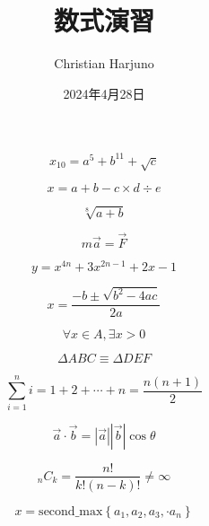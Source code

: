 \documentclass[a4j,twocolumn]{jarticle}
\begin{document}
\title{数式演習}
\author{Christian Harjuno}
\date{2024年4月28日}

\maketitle
\thispagestyle{empty}

\begin{equation}
x_{10}=a^5+b^{11}+\sqrt{c} 
\end{equation}

\begin{equation}
x = a + b - c \times d \div e
\end{equation}

\begin{equation}
\sqrt[8]{a + b}
\end{equation}

\begin{equation}
m\vec{a} = \vec{F}
\end{equation}

\begin{equation}
y = x^{4n} + 3x^{2n-1} + 2x - 1
\end{equation}

\begin{equation}
x = \frac{-b \pm \sqrt{b^2 - 4ac}}{2a}
\end{equation}

\begin{equation}
\forall x \in A,\exists x > 0
\end{equation}

\begin{equation}
\Delta ABC \equiv \Delta DEF
\end{equation}

\begin{equation}
\sum_{i = 1}^{n}i = 1 + 2 + \cdots + n = \frac{n(n + 1)}{2}
\end{equation}

\begin{equation}
\vec{a} \cdot \vec{b} = \left| \vec{a} \right| \left| \vec{b} \right| \cos \theta 
\end{equation}

\begin{equation}
  _n{C}_k = \frac{n!}{k!(n - k)!} \neq \infty
\end{equation}

\begin{equation}
  x = \text{second\_max}\left\{a_1,a_2,a_3,\cdot a_n\right\}
\end{equation}
\end{document}
